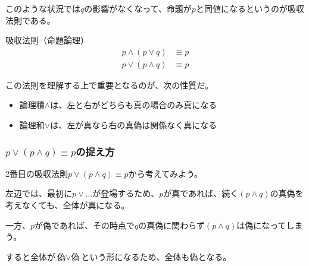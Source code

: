 \documentclass[../../imaging-math]{subfiles}
\begin{document}
このような状況では$q$の影響がなくなって、命題が$p$と同値になるというのが吸収法則である。

\begin{theorem}{吸収法則（命題論理）}
  \Large
  \begin{align*}
    p \land (p \lor q) & \equiv p \\
    p \lor (p \land q) & \equiv p
  \end{align*}
\end{theorem}

この法則を理解する上で重要となるのが、次の性質だ。

\begin{review}
  \begin{spacebox}
    \begin{itemize}
      \item 論理積$\land$は、左と右がどちらも真の場合のみ真になる
      \item 論理和$\lor$は、左が真なら右の真偽は関係なく真になる
    \end{itemize}
  \end{spacebox}
\end{review}

\subsubsection{$p \lor (p \land q) \equiv p$の捉え方}

2番目の吸収法則$p \lor (p \land q) \equiv p$から考えてみよう。

\br

\begin{tcolorbox}[empty, size=minimal, sidebyside, righthand ratio=0.35]
  左辺では、最初に$p \lor \ldots$が登場するため、$p$が真であれば、続く$(p\land q)$の真偽を考えなくても、全体が真になる。

  \br

  一方、$p$が偽であれば、その時点で$q$の真偽に関わらず$(p \land q)$は偽になってしまう。

  すると全体が$\text{偽} \lor \text{偽}$という形になるため、全体も偽となる。

  \tcblower

  \centering
\end{tcolorbox}
\end{document}
